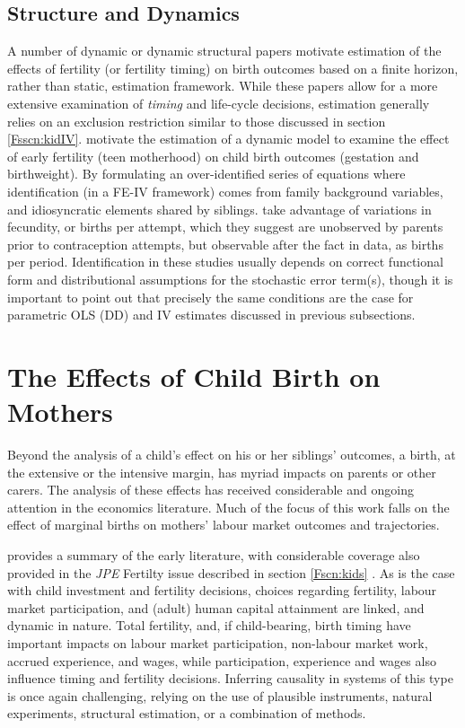 \subsection{Structure and Dynamics}
A number of dynamic or dynamic structural papers motivate estimation of the
effects of fertility (or fertility timing) on birth outcomes based on a finite 
horizon, rather than static, estimation framework.  While these papers allow for 
a more extensive examination of \emph{timing} and life-cycle decisions, 
estimation generally relies on an exclusion restriction similar to those 
discussed in section \ref{Fsscn:kidIV}.  \citet{RosenzweigWolpin1995} motivate 
the estimation of a dynamic model to examine the effect of early fertility (teen 
motherhood) on child birth outcomes (gestation and birthweight).  By formulating 
an over-identified series of equations where identification (in a FE-IV framework) 
comes from family background variables, and idiosyncratic elements shared by 
siblings. \citet{RosenzweigSchultz1985} take advantage of variations in 
fecundity, or births per attempt, which they suggest are unobserved by parents 
prior to contraception attempts, but observable after the fact in data, as births 
per period.  Identification in these studies usually depends on correct 
functional form and distributional assumptions for the stochastic error term(s), 
though it is important to point out that precisely the same conditions are the 
case for parametric OLS (DD) and IV estimates discussed in previous subsections.

\section{The Effects of Child Birth on Mothers}
\label{Fscn:mothers}
Beyond the analysis of a child's effect on his or her siblings' outcomes, a
birth, at the extensive or the intensive margin, has myriad impacts on parents
or other carers.  The analysis of these effects has received considerable and 
ongoing attention in the economics literature.  Much of the focus of this work
falls on the effect of marginal births on mothers' labour market outcomes and
trajectories.

\citet{FleisherRhodes1979} provides a summary of the early literature, with 
considerable coverage also provided in the \emph{JPE} Fertilty issue described
in section \ref{Fscn:kids} \citep{Willis1973,Gronau1973}.  As is the case with
child investment and fertility decisions, choices regarding fertility, labour
market participation, and (adult) human capital attainment are linked, and 
dynamic in nature.  Total fertility, and, if child-bearing, birth timing have
important impacts on labour market participation, non-labour market work, 
accrued experience, and wages, while participation, experience and wages also 
influence timing and fertility decisions. Inferring causality in systems of this 
type is once again challenging, relying on the use of plausible instruments, 
natural experiments, structural estimation, or a combination of methods.

